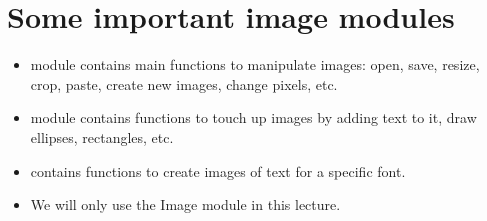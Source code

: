 \documentclass[letterpaper,10pt,english]{sphinxmanual}
\begin{document}
\section{Some important image modules}
\label{\detokenize{lecture_notes/lec07_modules_images:some-important-image-modules}}\begin{itemize}
\item {} 
 module contains main functions to manipulate images: open,
save, resize, crop, paste, create new images, change pixels, etc.

\item {} 
 module contains functions to touch up images by adding
text to it, draw ellipses, rectangles, etc.

\item {} 
 contains functions to create images of text for a
specific font.

\item {} 
We will only use the Image module in this lecture.

\end{itemize}
\end{document}

